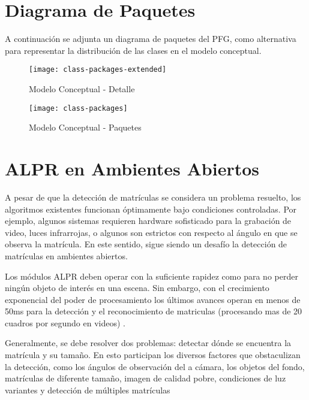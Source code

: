 \newpage
\chapter{Diagrama de Paquetes}
\label{appendix:paquetes}
A continuación se adjunta un diagrama de paquetes del PFG, como alternativa para representar la distribución de las clases en el modelo conceptual.
\begin{landscape}

        \begin{figure}[H]
        \centering
        \texttt{[image: class-packages-extended]}
        \caption{Modelo Conceptual - Detalle}
        \label{fig:CLASS-brief}
    \end{figure}
\end{landscape}

     \begin{figure}[H]
        \centering
        \texttt{[image: class-packages]}
        \caption{Modelo Conceptual - Paquetes}
        \label{fig:CLASS-crop}
    \end{figure}
    

\chapter{ALPR en Ambientes Abiertos}
A pesar de que la detección de matrículas se considera un problema resuelto, los algoritmos existentes funcionan óptimamente bajo condiciones controladas. Por ejemplo, algunos sistemas requieren hardware sofisticado para la grabación de video, luces infrarrojas, o algunos son estrictos con respecto al ángulo en que se observa la matrícula. En este sentido, sigue siendo un desafío la detección de matrículas en ambientes abiertos.

Los módulos ALPR deben operar con la suficiente rapidez como para no perder ningún objeto de interés en una escena. Sin embargo, con el crecimiento exponencial del poder de procesamiento los últimos avances operan en menos de 50ms para la detección y el reconocimiento de matriculas (procesando mas de 20 cuadros por segundo en videos) \cite{Anagnostopoulos2008-uh}.

Generalmente, se debe resolver dos problemas: detectar dónde se encuentra la matrícula y su tamaño. En esto participan los diversos factores que obstaculizan la detección, como los ángulos de observación del a cámara, los objetos del fondo, matrículas de diferente tamaño, imagen de calidad pobre, condiciones de luz variantes y detección de múltiples matrículas \cite{zhou2012}

